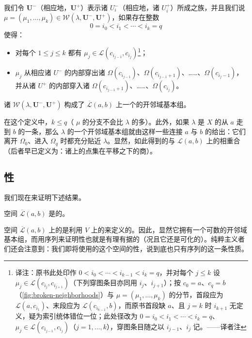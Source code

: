 我们令 $\mathbf{U}^-$（相应地，$\mathbf{U}^+$）表示诸 $U_i^-$（相应地，诸 $U_i^+$）所成之族，并且我们说 $\mu=(\mu_1,\dotsc,\mu_k)\in\mathcal{W}(\lambda,\mathbf{U}^-,\mathbf{U}^+)$，如果存在整数
\[
0=i_0<i_1<\cdots<i_k=q
\]
使得：
\begin{itemize}
\item 对每个 $1\le j\le k$ 都有 $\mu_j\in\mathcal{L}(c_{i_{j-1}},c_{i_j})$\footnote{译注：原书此处印作 $0<i_0<\cdots<i_{k-1}<i_k=q$，并对每个 $j\le k$ 设 $\mu_j\in\mathcal{L}(c_{i_j},c_{i_{j+1}})$（下列穿图条目亦同用 $i_j$、$i_{j+1}$）；按 $c_0=a$、$c_q=b$（\cref{fig:broken-neighborhoods}）与 $\mu=(\mu_1,\dotsc,\mu_k)$ 的分节，首段应为 $\mathcal{L}(a,c_{i_1})$、末段应为 $\mathcal{L}(c_{i_{k-1}},b)$，而原书首段缺 $a$、且 $j=k$ 时 $i_{k+1}$ 无定义，疑为索引统体错位一位；此处径改为 $0=i_0<i_1<\cdots<i_k=q$、$\mu_j\in\mathcal{L}(c_{i_{j-1}},c_{i_j})$（$j=1,\dotsc,k$），穿图条目随之以 $i_{j-1}$、$i_j$ 记。——译者注}；
\item $\mu_j$ 从相应诸 $U^-$ 的内部穿出诸\trChart{} $\Omega(c_{i_{j-1}})$、$\Omega(c_{i_{j-1}+1})$、……、$\Omega(c_{i_j-1})$，并从诸 $U^+$ 的内部穿入诸\trChart{} $\Omega(c_{i_{j-1}+1})$、……、$\Omega(c_{i_j})$。
\end{itemize}
诸 $\mathcal{W}(\lambda,\mathbf{U}^-,\mathbf{U}^+)$ 构成了 $\overline{\mathcal{L}}(a,b)$ 上一个\trTopology{}的开邻域基本组。

\begin{remark}\label{thm:broken-trajectory-topology}
在这个定义中，$k\le q$（\trTrajectory{} $\mu$ 的分支不会比 $\lambda$ 的多）。此外，如果 $\lambda$ 是 $X$ 的从 $a$ 走到 $b$ 的一条\trTrajectory，那么 $\lambda$ 的一个开邻域基本组就由这样一些连接 $a$ 与 $b$ 的\trTrajectory{}给出：它们离开 $\Omega_0$、进入 $\Omega_q$ 时都充分贴近 $\lambda$。显然，如此得到的\trTopology{}与 $\mathcal{L}(a,b)$ 上的\trTopology{}相重合（后者早已定义为：诸\trTrajectory{}上的点集在平移之下的商）。
\end{remark}

\subsection{\trCompact{}性}
\label{subsec:compactness}

我们现在来证明下述结果。

\begin{theorem}\label{thm:broken-space-compact}
空间 $\overline{\mathcal{L}}(a,b)$ 是\trCompact{}的。
\end{theorem}

\begin{remark}\label{thm:compactness-sequences}
空间 $\overline{\mathcal{L}}(a,b)$ 上的\trTopology{}是利用 $V$ 上的\trTopology{}来定义的。因此，显然它拥有一个可数的开邻域基本组，而用序列来证明\trCompact{}性也就是有理有据的（况且它还是可\trMetric{}化的）。纯粹主义者们还会注意到：我们即将使用的这个空间的\trCompact{}性，说到底也只有序列的这一条性质。
\end{remark}

